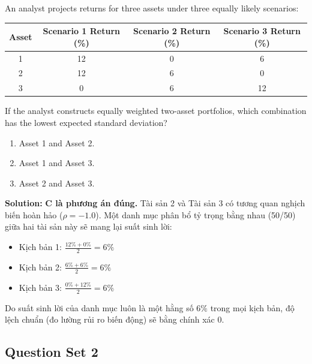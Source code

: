 \begin{tcolorbox}[
	colback=gray!5!white,
	colframe=black!15!white,
	boxrule=0.5pt,
	arc=3pt,
	title=\textbf{Question 5},
	coltitle=black,
	colbacktitle=black!5!white,
	before skip=6pt,
	after skip=6pt,
	breakable
]
An analyst projects returns for three assets under three equally likely scenarios:
\begin{center}
\begin{tabular}{c  c  c  c}
	\toprule
	\textbf{Asset} & \textbf{Scenario 1 Return (\%)} & \textbf{Scenario 2 Return (\%)} & \textbf{Scenario 3 Return (\%)} \\
	\midrule
	1 & 12 & 0 & 6 \\
	2 & 12 & 6 & 0 \\
	3 & 0 & 6 & 12 \\
	\bottomrule
\end{tabular}
\end{center}
If the analyst constructs equally weighted two-asset portfolios, which combination has the lowest expected standard deviation?
\begin{enumerate}[label=\Alph*.]
	\item Asset 1 and Asset 2.
	\item Asset 1 and Asset 3.
	\item Asset 2 and Asset 3.
\end{enumerate}

\textbf{Solution:}
\textbf{C là phương án đúng.} Tài sản 2 và Tài sản 3 có tương quan nghịch biến hoàn hảo ($\rho = -1.0$). Một danh mục phân bổ tỷ trọng bằng nhau (50/50) giữa hai tài sản này sẽ mang lại suất sinh lời:
\begin{itemize}
	\item Kịch bản 1: $\frac{12\% + 0\%}{2} = 6\%$
	\item Kịch bản 2: $\frac{6\% + 6\%}{2} = 6\%$
	\item Kịch bản 3: $\frac{0\% + 12\%}{2} = 6\%$
\end{itemize}
Do suất sinh lời của danh mục luôn là một hằng số $6\%$ trong mọi kịch bản, độ lệch chuẩn (đo lường rủi ro biến động) sẽ bằng chính xác 0.
\end{tcolorbox}

\subsection{Question Set 2}
\label{subsec:app_Question Set 2}

